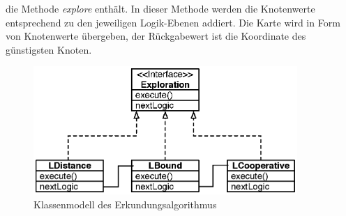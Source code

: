 \documentclass[10pt,a4paper]{article}
\begin{document}
  					die Methode \textit{explore} enthält. In dieser Methode werden die Knotenwerte entsprechend zu den jeweiligen Logik-Ebenen
  					addiert. Die Karte wird in Form von Knotenwerte übergeben, der Rückgabewert ist die Koordinate des günstigsten Knoten.
 					\begin{figure}[h]
						\centering
						\includegraphics[width=10cm]{images/exploration_design.eps}
  						\caption{Klassenmodell des Erkundungsalgorithmus}
  						\label{fig:klassen_modell}
  					\end{figure} 
\end{document}
